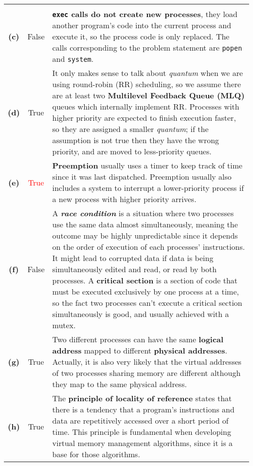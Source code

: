 {\begin{center}
\begin{longtable}{c | c p{132mm}}
\begin{minipage}{0.34\textwidth}
        \end{minipage} \\
        \textbf{(c)} & False & \textbf{\texttt{exec} calls do not create new processes}, they load another program's code into the current process and execute it, so the process code is only replaced. The calls corresponding to the problem statement are \texttt{popen} and \texttt{system}. \\
        \textbf{(d)} & True & It only makes sense to talk about \emph{quantum} when we are using round-robin (RR) scheduling, so we assume there are at least two \textbf{Multilevel Feedback Queue (MLQ)} queues which internally implement RR. Processes with higher priority are expected to finish execution faster, so they are assigned a smaller \emph{quantum}; if the assumption is not true then they have the wrong priority, and are moved to less-priority queues. \\
        \textbf{(e)} & \textcolor{red}{True} & \textbf{Preemption} usually uses a timer to keep track of time since it was last dispatched. Preemption usually also includes a system to interrupt a lower-priority process if a new process with higher priority arrives. \\
        \textbf{(f)} & False & A \textbf{\emph{race condition}} is a situation where two processes use the same data almost simultaneously, meaning the outcome may be highly unpredictable since it depends on the order of execution of each processes' instructions. It might lead to corrupted data if data is being simultaneously edited and read, or read by both processes. A \textbf{critical section} is a section of code that must be executed exclusively by one process at a time, so the fact two processes can't execute a critical section simultaneously is good, and usually achieved with a mutex. \\
        \textbf{(g)} & True & Two different processes can have the same \textbf{logical address} mapped to different \textbf{physical addresses}. Actually, it is also very likely that the virtual addresses of two processes sharing memory are different although they map to the same physical address. \\
        \textbf{(h)} & True & The \textbf{principle of locality of reference} states that there is a tendency that a program's instructions and data are repetitively accessed over a short period of time. This principle is fundamental when developing virtual memory management algorithms, since it is a base for those algorithms. \\

\end{longtable}
\end{center}}
